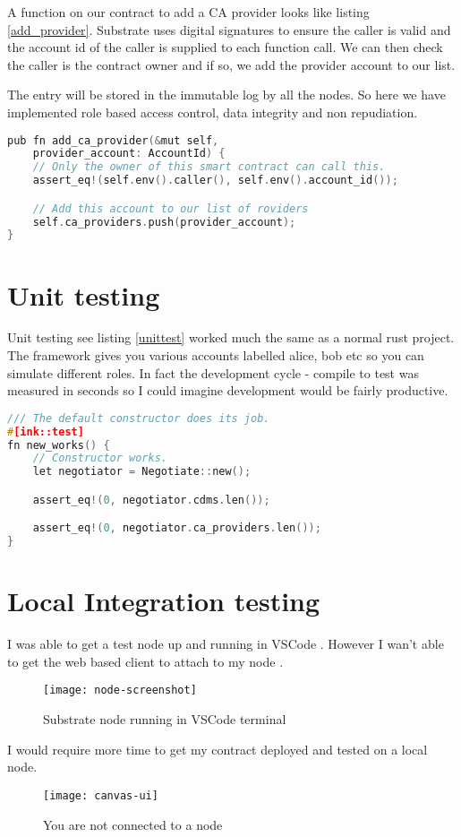 A function on our contract to add a CA provider looks like listing \ref{add_provider}. 
Substrate uses digital signatures to ensure the caller is valid and the account id 
of the caller is supplied to each function call. 
We can then check the caller is the contract owner and if so, we add the provider account to our list.

The entry will be stored in the immutable log by all the nodes. So here we have implemented role based access control, 
data integrity and non repudiation. 


\begin{lstlisting}[label={add_provider},language=c,caption={Add a provider}]
pub fn add_ca_provider(&mut self, 
    provider_account: AccountId) {
    // Only the owner of this smart contract can call this.
    assert_eq!(self.env().caller(), self.env().account_id());

    // Add this account to our list of roviders
    self.ca_providers.push(provider_account);
}
\end{lstlisting}

\section{Unit testing}

Unit testing see listing \ref{unittest} worked much the same as a normal rust project. The framework gives you 
various accounts labelled alice, bob etc so you can simulate different roles.
In fact the development cycle - compile to test was measured in seconds so 
I could imagine development would be fairly productive.

\begin{lstlisting}[label={unittest},language=c,caption={Unit Testing}]
/// The default constructor does its job.
#[ink::test]
fn new_works() {
    // Constructor works.
    let negotiator = Negotiate::new();

    assert_eq!(0, negotiator.cdms.len());

    assert_eq!(0, negotiator.ca_providers.len());
}
\end{lstlisting}

\section{Local Integration testing}

I was able to get a test node up and running in VSCode \pageref{node}. 
However I wan't able to get the web based client to attach to my node \pageref{canvas}.

\begin{figure}[h]
    \texttt{[image: node-screenshot]} 
    \caption{Substrate node running in VSCode terminal}
    \label{node}
\end{figure}

I would require more time to get my contract deployed and tested on a local node.

\begin{figure}[h]
    \texttt{[image: canvas-ui]} 
    \caption{You are not connected to a node}
    \label{canvas}
\end{figure}